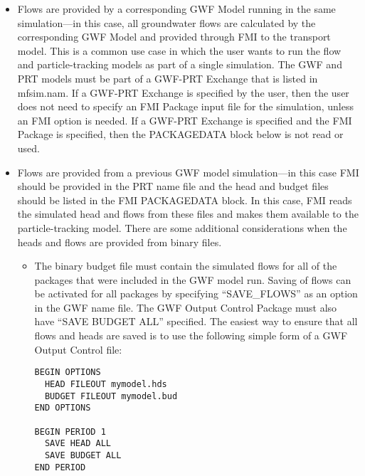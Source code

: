 \begin{itemize}

\item Flows are provided by a corresponding GWF Model running in the same simulation---in this case, all groundwater flows are calculated by the corresponding GWF Model and provided through FMI to the transport model.  This is a common use case in which the user wants to run the flow and particle-tracking models as part of a single simulation.  The GWF and PRT models must be part of a GWF-PRT Exchange that is listed in mfsim.nam.  If a GWF-PRT Exchange is specified by the user, then the user does not need to specify an FMI Package input file for the simulation, unless an FMI option is needed.  If a GWF-PRT Exchange is specified and the FMI Package is specified, then the PACKAGEDATA block below is not read or used.

\item Flows are provided from a previous GWF model simulation---in this case FMI should be provided in the PRT name file and the head and budget files should be listed in the FMI PACKAGEDATA block.  In this case, FMI reads the simulated head and flows from these files and makes them available to the particle-tracking model.  There are some additional considerations when the heads and flows are provided from binary files.

\begin{itemize}
\item The binary budget file must contain the simulated flows for all of the packages that were included in the GWF model run.  Saving of flows can be activated for all packages by specifying ``SAVE\_FLOWS'' as an option in the GWF name file.  The GWF Output Control Package must also have ``SAVE BUDGET ALL'' specified.  The easiest way to ensure that all flows and heads are saved is to use the following simple form of a GWF Output Control file:

\begin{verbatim}
BEGIN OPTIONS
  HEAD FILEOUT mymodel.hds
  BUDGET FILEOUT mymodel.bud
END OPTIONS

BEGIN PERIOD 1
  SAVE HEAD ALL
  SAVE BUDGET ALL
END PERIOD
\end{verbatim}


\end{itemize}
\end{itemize}

